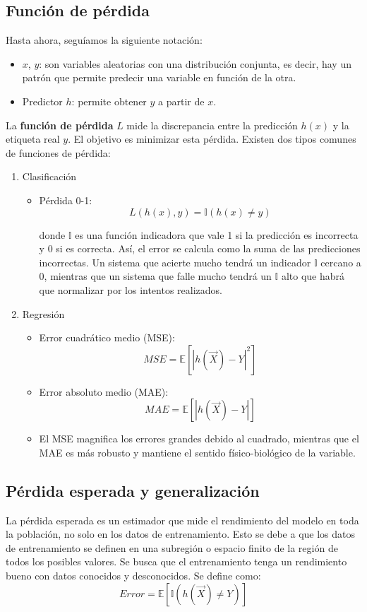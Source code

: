 \subsection{Función de pérdida}
Hasta ahora, seguíamos la siguiente notación:
\begin{itemize}
\item $x$, $y$: son variables aleatorias con una distribución conjunta, es decir, hay un patrón que permite predecir una variable en función de la otra.
\item Predictor $h$: permite obtener $y$ a partir de $x$.
\end{itemize}

La \textbf{función de pérdida} $L$ mide la discrepancia entre la predicción $h(x)$ y la etiqueta real $y$. El objetivo es minimizar esta pérdida. Existen dos tipos comunes de funciones de pérdida:
\begin{enumerate}
\item Clasificación
\begin{itemize}
\item Pérdida 0-1: 
$$L(h(x),y) = \mathbb{I}(h(x) \neq y)$$

donde $\mathbb{I}$ es una función indicadora que vale 1 si la predicción es incorrecta y 0 si es correcta. Así, el error se calcula como la suma de las predicciones incorrectas. Un sistema que acierte mucho tendrá un indicador $\mathbb{I}$ cercano a 0, mientras que un sistema que falle mucho tendrá un $\mathbb{I}$ alto que habrá que normalizar por los intentos realizados.
\end{itemize}

\item Regresión
\begin{itemize}
\item Error cuadrático medio (MSE):
$$MSE = \mathbb{E}[|h(\vec{X}) - Y|^2]$$

\item Error absoluto medio (MAE):
$$MAE = \mathbb{E}[|h(\vec{X}) - Y|]$$

\item El MSE magnifica los errores grandes debido al cuadrado, mientras que el MAE es más robusto y mantiene el sentido físico-biológico de la variable.
\end{itemize}
\end{enumerate}

\subsection{Pérdida esperada y generalización}
La pérdida esperada es un estimador que mide el rendimiento del modelo en toda la población, no solo en los datos de entrenamiento. Esto se debe a que los datos de entrenamiento se definen en una subregión o espacio finito de la región de todos los posibles valores. Se busca que el entrenamiento tenga un rendimiento bueno con datos conocidos y desconocidos. Se define como:
$$Error = \mathbb{E}[\mathbb{I}(h(\vec{X}) \neq Y)]$$

